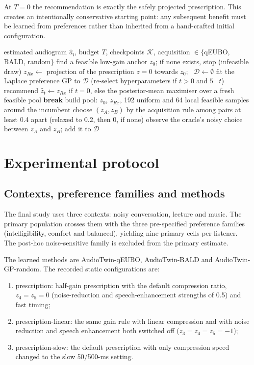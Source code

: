 \documentclass[preprint,12pt]{elsarticle}
\begin{document}
At $T=0$ the recommendation is exactly the safely projected prescription. This creates an intentionally conservative starting point: any subsequent benefit must be learned from preferences rather than inherited from a hand-crafted initial configuration.

\begin{algorithm}[!htbp]
\caption{One AudioTwin episode for listener $l$, context $c$ and family $F$}
\label{alg:loop}
\begin{algorithmic}[1]
\Require estimated audiogram $\hat a_l$, budget $T$, checkpoints $\mathcal K$, acquisition $\in\{$qEUBO, BALD, random$\}$
\State find a feasible low-gain anchor $z_0$; if none exists, stop (infeasible draw)
\State $z_{Rx}\gets$ projection of the prescription $z=0$ towards $z_0$; \ $\mathcal D\gets\emptyset$
  \State fit the Laplace preference GP to $\mathcal D$ (re-select hyperparameters if $t>0$ and $5\mid t$)
     \State recommend $\hat z_t\gets z_{Rx}$ if $t=0$, else the posterior-mean maximiser over a fresh feasible pool
  \EndIf
   \textbf{break} \EndIf
  \State build pool: $z_0$, $z_{Rx}$, 192 uniform and 64 local feasible samples around the incumbent
  \State choose $(z_A,z_B)$ by the acquisition rule among pairs at least 0.4 apart (relaxed to 0.2, then 0, if none)
  \State observe the oracle's noisy choice between $z_A$ and $z_B$; add it to $\mathcal D$
\EndFor
\end{algorithmic}
\end{algorithm}

\section{Experimental protocol}
\label{sec:protocol}

\subsection{Contexts, preference families and methods}

The final study uses three contexts: noisy conversation, lecture and music. The primary population crosses them with the three pre-specified preference families (intelligibility, comfort and balanced), yielding nine primary cells per listener. The post-hoc noise-sensitive family is excluded from the primary estimate.

The learned methods are AudioTwin-qEUBO, AudioTwin-BALD and AudioTwin-GP-random. The recorded static configurations are:
\begin{enumerate}
    \item prescription: half-gain prescription with the default compression ratio, $z_4=z_5=0$ (noise-reduction and speech-enhancement strengths of 0.5) and fast timing;
    \item prescription-linear: the same gain rule with linear compression and with noise reduction and speech enhancement both switched off ($z_3=z_4=z_5=-1$);
    \item prescription-slow: the default prescription with only compression speed changed to the slow 50/500-ms setting.
\end{enumerate}
\end{document}
